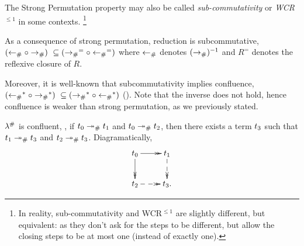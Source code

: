 \bigskip


The Strong Permutation property may also be called \emph{sub-commutativity}
or \emph{WCR$^{\leq 1}$} in some contexts.
\footnote{In reality, sub-commutativity and WCR$^{\leq 1}$ are slightly different,
but equivalent:
as they don't ask for the steps to be different,
but allow the closing steps to be at most one (instead of exactly one).}

As a consequence of strong permutation, reduction is subcommutative,
\ie $(\mathrel{\leftarrow_{\mathtt{\#}}} \circ \mathrel{\to_{\mathtt{\#}}})\ \subseteq (\mathrel{\to_{\mathtt{\#}}}^= \circ \mathrel{\leftarrow_{\mathtt{\#}}}^=)$
where
$\mathrel{\leftarrow_{\mathtt{\#}}}$ denotes $(\mathrel{\to_{\mathtt{\#}}})^{-1}$
and $R^=$ denotes the reflexive closure of $R$.

Moreover, it is well-known that subcommutativity implies confluence,
\ie $(\mathrel{\leftarrow_{\mathtt{\#}}}^* \circ \mathrel{\to_{\mathtt{\#}}}^*)\ \subseteq (\mathrel{\to_{\mathtt{\#}}}^* \circ \mathrel{\leftarrow_{\mathtt{\#}}}^*)$
(\cf \cite[Proposition 1.1.10]{Terese}). Note that the
inverse does not hold, hence confluence is weaker than strong permutation, as we previously stated.

\begin{corollary}[Confluence]
$\lambda^{\mathtt{\#}}$ is confluent, \ie,
if $t_0 \mathrel{\mathrel{\twoheadrightarrow}_{\mathtt{\#}}} t_1$ and $t_0 \mathrel{\mathrel{\twoheadrightarrow}_{\mathtt{\#}}} t_2$, then there exists a term $t_3$
such that $t_1 \mathrel{\mathrel{\twoheadrightarrow}_{\mathtt{\#}}} t_3$ and $t_2 \mathrel{\mathrel{\twoheadrightarrow}_{\mathtt{\#}}} t_3$.
Diagramatically,
\[
    \xymatrix{
      \tm_0 \ar@{->>}[d]
            \ar@{->>}[r] &
      \tm_1 \ar@{-->>}[d] \\
            \ar@{-->>}[r]
      \tm_2 &
      \tm_3. \\
    }
\]
\end{corollary}


